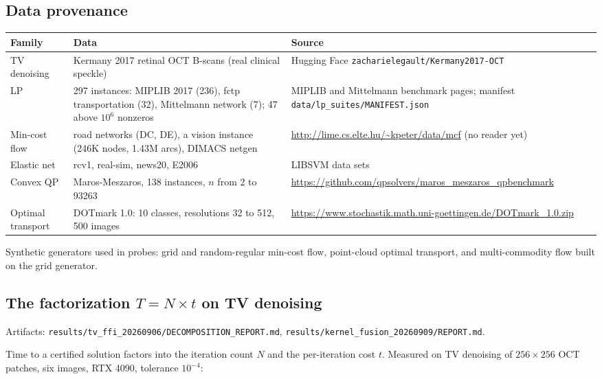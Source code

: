 \subsection{Data provenance}
\label{app:log:data}

\begin{center}
\small
\begin{tabular}{p{2.3cm}p{4.6cm}p{5.6cm}}
\toprule
Family & Data & Source \\
\midrule
TV denoising & Kermany 2017 retinal OCT B-scans (real clinical speckle) &
  Hugging Face \texttt{zacharielegault/Kermany2017-OCT} \\
LP & 297 instances: MIPLIB 2017 (236), fctp transportation (32), Mittelmann
  network (7); 47 above $10^6$ nonzeros & MIPLIB and Mittelmann benchmark
  pages; manifest \texttt{data/lp\_suites/MANIFEST.json} \\
Min-cost flow & road networks (DC, DE), a vision instance (246K nodes, 1.43M
  arcs), DIMACS netgen & \url{http://lime.cs.elte.hu/~kpeter/data/mcf}
  (no reader yet) \\
Elastic net & rcv1, real-sim, news20, E2006 & LIBSVM data sets \\
Convex QP & Maros-Meszaros, 138 instances, $n$ from 2 to 93263 &
  \url{https://github.com/qpsolvers/maros_meszaros_qpbenchmark} \\
Optimal transport & DOTmark 1.0: 10 classes, resolutions 32 to 512, 500
  images & \url{https://www.stochastik.math.uni-goettingen.de/DOTmark_1.0.zip} \\
\bottomrule
\end{tabular}
\end{center}

Synthetic generators used in probes: grid and random-regular min-cost flow,
point-cloud optimal transport, and multi-commodity flow built on the grid
generator.

\subsection{The factorization $T = N \times t$ on TV denoising}
\label{app:log:factorisation}

Artifacts: \texttt{results/tv\_ffi\_20260906/DECOMPOSITION\_REPORT.md},
\texttt{results/kernel\_fusion\_20260909/REPORT.md}.

Time to a certified solution factors into the iteration count $N$ and the
per-iteration cost $t$. Measured on TV denoising of $256\times256$ OCT
patches, six images, RTX 4090, tolerance $10^{-4}$:

